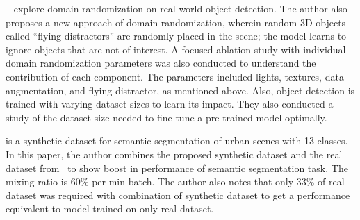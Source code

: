 ~\cite{Tremblay2018TrainingDN}  explore domain randomization on real-world object detection.
The author also proposes a new approach of domain randomization, wherein random 3D objects called ``flying distractors” are randomly placed in the scene;
the model learns to ignore objects that are not of interest.
A focused ablation study with individual domain randomization parameters was also conducted to understand the contribution of each component.
The parameters included lights, textures, data augmentation, and flying distractor, as mentioned above.
Also, object detection is trained with varying dataset sizes to learn its impact.
They also conducted a study of the dataset size needed to fine-tune a pre-trained model optimally.

\cite{synthia} is a synthetic dataset for semantic segmentation of urban scenes with 13 classes.
In this paper, the author combines the proposed synthetic dataset and the real dataset from~\cite{Geiger2012CVPR,Russell2008,BrostowSFC:ECCV08} to show boost in performance of semantic segmentation task.
The mixing ratio is 60\% per min-batch.
The author also notes that only 33\% of real dataset was required with combination of synthetic dataset to get a performance equivalent to model trained on only real dataset.

